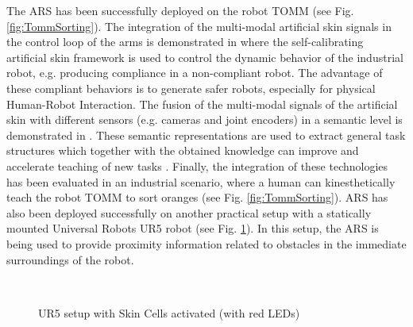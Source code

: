 The ARS has been successfully deployed on the robot TOMM \cite{Dean-ICRA17} (see Fig. \ref{fig:TommSorting}). The integration of the multi-modal artificial skin signals in the control loop of the arms is demonstrated in \cite{Dean-Humanoids16} where the self-calibrating artificial skin framework is used to control the dynamic behavior of the industrial robot, e.g. producing compliance in a non-compliant robot. The advantage of these compliant behaviors is to generate safer robots, especially for physical Human-Robot Interaction. The fusion of the multi-modal signals of the artificial skin with different sensors (e.g. cameras and joint encoders) in a semantic level is demonstrated in \cite{Ramirez-Amaro-Humanoids16}. These semantic representations are used to extract general task structures which together with the obtained knowledge can improve and accelerate teaching of new tasks \cite{Dynaov-Humanoids16}. Finally, the integration of these technologies has been evaluated in an industrial scenario, where a human can kinesthetically teach the robot TOMM to sort oranges \cite{Dean-IECON16} (see Fig. \ref{fig:TommSorting}). ARS has also been deployed successfully on another practical setup with a statically mounted Universal Robots UR5 robot (see Fig. \ref{fig:TUDSetup}). In this setup, the ARS is being used to provide proximity information related to obstacles in the immediate surroundings of the robot.

\begin{figure}[h]
\centering
{}\\[-10pt]
\caption[]{UR5 setup with Skin Cells activated (with red LEDs)}
\label{fig:TUDSetup}
\end{figure}


